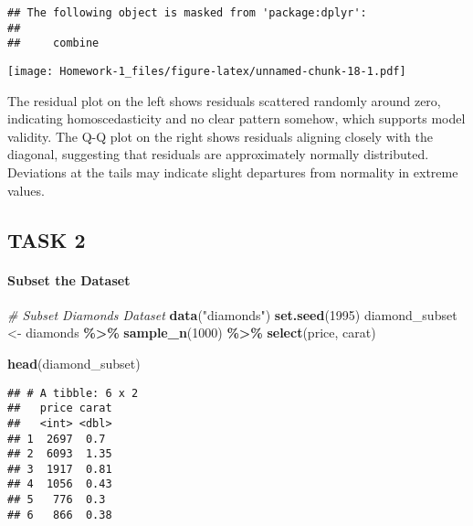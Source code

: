 \documentclass[
]{article}
\newenvironment{Shaded}{\begin{snugshade}}{\end{snugshade}}
\newcommand{\CommentTok}[1]{\textcolor[rgb]{0.56,0.35,0.01}{\textit{#1}}}
\newcommand{\DecValTok}[1]{\textcolor[rgb]{0.00,0.00,0.81}{#1}}
\newcommand{\FunctionTok}[1]{\textcolor[rgb]{0.13,0.29,0.53}{\textbf{#1}}}
\newcommand{\NormalTok}[1]{#1}
\newcommand{\OtherTok}[1]{\textcolor[rgb]{0.56,0.35,0.01}{#1}}
\newcommand{\SpecialCharTok}[1]{\textcolor[rgb]{0.81,0.36,0.00}{\textbf{#1}}}
\newcommand{\StringTok}[1]{\textcolor[rgb]{0.31,0.60,0.02}{#1}}
\begin{document}
\begin{verbatim}
## The following object is masked from 'package:dplyr':
## 
##     combine
\end{verbatim}

\texttt{[image: Homework-1\_files/figure-latex/unnamed-chunk-18-1.pdf]}

The residual plot on the left shows residuals scattered randomly around
zero, indicating homoscedasticity and no clear pattern somehow, which
supports model validity. The Q-Q plot on the right shows residuals
aligning closely with the diagonal, suggesting that residuals are
approximately normally distributed. Deviations at the tails may indicate
slight departures from normality in extreme values.

\subsection{TASK 2}\label{task-2}

\paragraph{Subset the Dataset}\label{subset-the-dataset}

\begin{Shaded}
\begin{Highlighting}[]
\CommentTok{\# Subset Diamonds Dataset}
\FunctionTok{data}\NormalTok{(}\StringTok{"diamonds"}\NormalTok{)}
\FunctionTok{set.seed}\NormalTok{(}\DecValTok{1995}\NormalTok{)}
\NormalTok{diamond\_subset }\OtherTok{\textless{}{-}}\NormalTok{ diamonds }\SpecialCharTok{\%\textgreater{}\%}
  \FunctionTok{sample\_n}\NormalTok{(}\DecValTok{1000}\NormalTok{) }\SpecialCharTok{\%\textgreater{}\%}
  \FunctionTok{select}\NormalTok{(price, carat)}
\end{Highlighting}
\end{Shaded}

\begin{Shaded}
\begin{Highlighting}[]
\FunctionTok{head}\NormalTok{(diamond\_subset)}
\end{Highlighting}
\end{Shaded}

\begin{verbatim}
## # A tibble: 6 x 2
##   price carat
##   <int> <dbl>
## 1  2697  0.7 
## 2  6093  1.35
## 3  1917  0.81
## 4  1056  0.43
## 5   776  0.3 
## 6   866  0.38
\end{verbatim}
\end{document}
